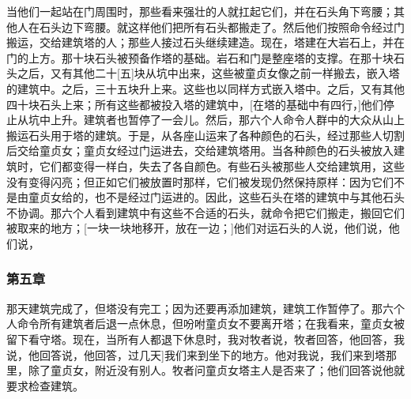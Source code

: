 当他们一起站在门周围时，那些看来强壮的人就扛起它们，并在石头角下弯腰；其他人在石头边下弯腰。就这样他们把所有石头都搬走了。然后他们按照命令经过门搬运，交给建筑塔的人；那些人接过石头继续建造。现在，塔建在大岩石上，并在门的上方。那十块石头被预备作塔的基础。岩石和门是整座塔的支撑。在那十块石头之后，又有其他二十[五]块从坑中出来，这些被童贞女像之前一样搬去，嵌入塔的建筑中。之后，三十五块升上来。这些也以同样方式嵌入塔中。之后，又有其他四十块石头上来；所有这些都被投入塔的建筑中，[在塔的基础中有四行，]他们停止从坑中上升。建筑者也暂停了一会儿。然后，那六个人命令人群中的大众从山上搬运石头用于塔的建筑。于是，从各座山运来了各种颜色的石头，经过那些人切割后交给童贞女；童贞女经过门运进去，交给建筑塔用。当各种颜色的石头被放入建筑时，它们都变得一样白，失去了各自颜色。有些石头被那些人交给建筑用，这些没有变得闪亮；但正如它们被放置时那样，它们被发现仍然保持原样：因为它们不是由童贞女给的，也不是经过门运进的。因此，这些石头在塔的建筑中与其他石头不协调。那六个人看到建筑中有这些不合适的石头，就命令把它们搬走，搬回它们被取来的地方；[一块一块地移开，放在一边；]他们对运石头的人说，他们说，他们说，\par


\subsubsection{第五章}

那天建筑完成了，但塔没有完工；因为还要再添加建筑，建筑工作暂停了。那六个人命令所有建筑者后退一点休息，但吩咐童贞女不要离开塔；在我看来，童贞女被留下看守塔。现在，当所有人都退下休息时，我对牧者说，牧者回答，他回答，我说，他回答说，他回答，\Quote{你就会知道一切。因为过几天[我们将来到这里，你将看到发生在这座塔上的其他事情，并准确知道所有比喻。}过几天]我们来到坐下的地方。他对我说，我们来到塔那里，除了童贞女，附近没有别人。牧者问童贞女塔主人是否来了；他们回答说他就要求检查建筑。\par


